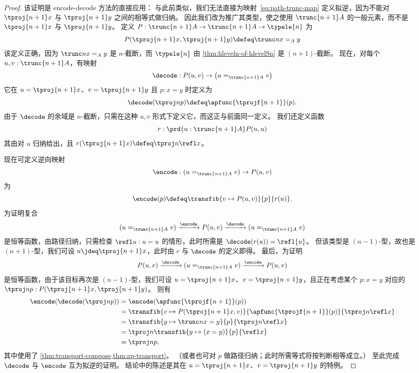 \begin{proof}
  该证明是 encode-decode 方法的直接应用：
  与此前类似，我们无法直接为映射~\eqref{eq:path-trunc-map} 定义拟逆，因为不能对
$\tproj {n+1}x$ 与 $\tproj {n+1}y$ 之间的相等式做归纳。
  因此我们改为推广其类型，使之使用 $\trunc{n+1}A$ 的一般元素，而不是 $\tproj {n+1}x$ 与 $\tproj
{n+1}y$。
  定义 $P:\trunc {n+1}A\to\trunc {n+1}A\to\typele{n}$ 为
  \[P(\tproj {n+1}x,\tproj {n+1}y)\defeq \trunc n{x=_Ay}\]
  该定义正确，因为 $\trunc n{x=_Ay}$ 是 $n$-截断，而 $\typele{n}$ 由
\cref{thm:hleveln-of-hlevelSn} 是 $(n+1)$-截断。
  现在，对每个 $u,v:\trunc{n+1}A$，有映射
  \[\decode:P(u,v) \to \big(u=_{\trunc{n+1}A}v\big)\]
  它在 $u=\tproj {n+1}x$、$v=\tproj {n+1}y$ 且 $p:x=y$ 时定义为
  \[\decode(\tproj n{p})\defeq \apfunc{\tprojf{n+1}} (p).\]
  由于 $\decode$ 的余域是 $n$-截断，只需在这种 $u,v$ 形式下定义它，而这正与前面同一定义。
  我们还定义函数
  \[ r : \prd{u:\trunc{n+1} A} P(u,u) \]
  其由对 $u$ 归纳给出，且 $r(\tproj{n+1} x) \defeq \tproj n {\refl x}$。

  现在可定义逆向映射
  \[\encode: (u=_{\trunc{n+1}A}v) \to P(u,v)\]
  为
  \[\encode(p) \defeq \transfib{v\mapsto P(u,v)}{p}{r(u)}. \]
  为证明复合
  \[ (u=_{\trunc{n+1}A}v) \xrightarrow{\encode} P(u,v) \xrightarrow{\decode} (u=_{\trunc{n+1}A}v) \]
  是恒等函数，由路径归纳，只需检查 $\refl u : u=u$ 的情形，此时所需是
$\decode(r(u)) = \refl{u}$。
  但该类型是 $(n-1)$-型，故也是 $(n+1)$-型，我们可设 $u\jdeq \tproj {n+1} x$，此时由 $r$ 与 $\decode$ 的定义即得。
  最后，为证明
  \[ P(u,v) \xrightarrow{\decode} (u=_{\trunc{n+1}A}v) \xrightarrow{\encode} P(u,v) \]
  是恒等函数，由于该目标再次是 $(n-1)$-型，我们可设 $u=\tproj {n+1}x$、$v=\tproj {n+1}y$，且正在考虑某个 $p:x=y$ 对应的
$\tproj n p:P(\tproj{n+1}x,\tproj{n+1}y)$。
  则有
  \begin{align*}
    \encode(\decode(\tproj n p)) &= \encode(\apfunc{\tprojf{n+1}}(p))\\
    &= \transfib{v\mapsto P(\tproj{n+1}x,v)}{\apfunc{\tprojf{n+1}}(p)}{\tproj n {\refl x}}\\
    &= \transfib{y\mapsto \trunc n{x=y}}{p}{\tproj n {\refl x}}\\
    &= \tproj n {\transfib{y \mapsto (x=y)}{p}{\refl x}}\\
    &= \tproj n p,
  \end{align*}
  其中使用了 \cref{thm:transport-compose,thm:ap-transport}。
  （或者也可对 $p$ 做路径归纳；此时所需等式将按判断相等成立。）
  至此完成 $\decode$ 与 $\encode$ 互为拟逆的证明。
  结论中的陈述是其在 $u=\tproj {n+1}x$、$v=\tproj {n+1}y$ 的特例。
\end{proof}

